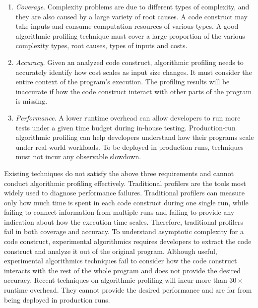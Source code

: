 \begin{enumerate}

\item \textit{Coverage}. Complexity problems are due to different types of complexity,
and they are also caused by a large variety of root causes.
A code construct may take inputs and
consume computation resources of various types.
A good algorithmic profiling technique must cover a
large proportion of the various complexity types, root causes, types of inputs and costs.


\item \textit{Accuracy}.
Given an analyzed code construct,
algorithmic profiling needs to accurately identify
how cost scales as input size changes.
It must consider the entire context of the program's execution.
The profiling results will be inaccurate if how the code construct interact with other parts of the program is missing.

\item \textit{Performance}.
A lower runtime overhead can allow developers to run more tests
under a given time budget during in-house testing.
Production-run algorithmic profiling can help developers
understand how their programs scale
under real-world workloads.
To be deployed in production runs,
techniques must not incur any observable slowdown.


\end{enumerate}

Existing techniques do not satisfy the above three requirements and
cannot conduct algorithmic profiling effectively.
Traditional profilers are the tools most widely used to
diagnose performance failures\cite{gprof,oprofile}.
Traditional profilers can measure only how much time is spent in each code construct during one single run,
while failing to connect information from multiple runs
and failing to provide any indication about how the execution time scales.
Therefore, traditional profilers fail in both coverage and accuracy.
To understand asymptotic complexity for a code construct,
experimental algorithmics\cite{expalg1,expalg2,expalg3} requires developers to
extract the code construct and analyze it out of the original program.
Although useful,
experimental algorithmics techniques fail to consider how the code
construct interacts with the rest of the whole program and does not provide the desired accuracy.
Recent techniques on algorithmic profiling\cite{Aprof1,Aprof2,AlgoProf} will incur more than $30\times$ runtime overhead.
They cannot provide the desired performance and are far from being deployed in production runs.


